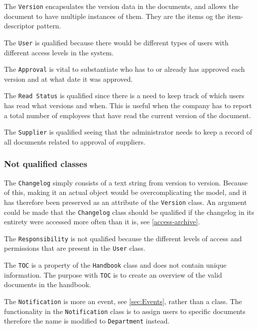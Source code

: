 The \texttt{Version} encapsulates the version data in the documents, and allows the document to have multiple instances of them.
They are the items og the item-descriptor pattern.

The \texttt{User} is qualified because there would be different types of users with different access levels in the system.

The \texttt{Approval} is vital to substantiate who has to or already has approved each version and at what date it was approved.

The \texttt{Read Status} is qualified since there is a need to keep track of which users has read what versions and when.
This is useful when the company has to report a total number of employees that have read the current version of the document.

The \texttt{Supplier} is qualified seeing that the administrator needs to keep a record of all documents related to approval of suppliers.

\subsubsection*{Not qualified classes}

The \texttt{Changelog} simply consists of a text string from version to version.
Because of this, making it an actual object would be overcomplicating the model, and it has therefore been preserved as an attribute of the \texttt{Version} class.
An argument could be made that the \texttt{Changelog} class should be qualified if the changelog in its entirety were accessed more often than it is, see \cref{access-archive}.

The \texttt{Responsibility} is not qualified because the different levels of access and permissions that are present in the \texttt{User} class.

The \texttt{TOC} is a property of the \texttt{Handbook} class and does not contain unique information.
The purpose with \texttt{TOC} is to create an overview of the valid documents in the handbook.

The \texttt{Notification} is more an event, see \cref{sec:Events}, rather than a class.
The functionality in the \texttt{Notification} class is to assign users to specific documents therefore the name is modified to \texttt{Department} instead.

